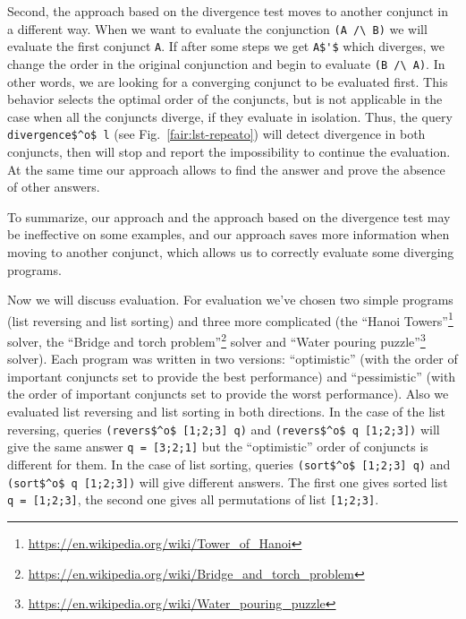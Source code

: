 Second, the approach based on the divergence test moves to another conjunct in a different way. When we want to evaluate the conjunction \lstinline{(A /\ B)} we will evaluate the first conjunct \lstinline{A}. If after some steps we get \lstinline{A$'$} which diverges, we change the order in the original conjunction and begin to evaluate \lstinline{(B /\ A)}. In other words, we are looking for a converging conjunct to be evaluated first. This behavior selects the optimal order of the conjuncts, but is not applicable in the case when all the conjuncts diverge, if they evaluate in isolation. Thus, the query \lstinline{divergence$^o$ l} (see Fig.~\ref{fair:lst-repeato}) will detect divergence in both conjuncts, then will stop and report the impossibility to continue the evaluation. At the same time our approach allows to find the answer and prove the absence of other answers.

To summarize, our approach and the approach based on the divergence test may be ineffective on some examples, and our approach saves more information when moving to another conjunct, which allows us to correctly evaluate some diverging programs.


Now we will discuss evaluation. For evaluation we've chosen two simple programs (list reversing and list sorting) and three more complicated (the ``Hanoi Towers''\footnote{\url{https://en.wikipedia.org/wiki/Tower_of_Hanoi}} solver, the
``Bridge and torch problem''\footnote{\url{https://en.wikipedia.org/wiki/Bridge_and_torch_problem}} solver and ``Water pouring puzzle''\footnote{\url{https://en.wikipedia.org/wiki/Water_pouring_puzzle}} solver).
Each program was written in two versions: ``optimistic'' (with the order of important conjuncts set to provide the best performance) and ``pessimistic'' (with the order of important
conjuncts set to provide the worst performance). Also we evaluated list reversing and list sorting in both directions. In the case of the list reversing, queries \lstinline{(revers$^o$ [1;2;3] q)} and \lstinline{(revers$^o$ q [1;2;3])}\! will give the same answer \lstinline{q = [3;2;1]} but the ``optimistic'' order of conjuncts is different for them. In the case of list sorting, queries \lstinline{(sort$^o$ [1;2;3] q)} and \lstinline{(sort$^o$ q [1;2;3])} will give different answers. The first one gives sorted list \lstinline{q = [1;2;3]}, the second one gives all permutations of list \lstinline{[1;2;3]}\!\!. 

